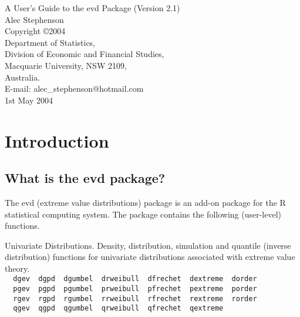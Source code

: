 \documentclass[11pt,a4paper]{article}
\begin{document}
\sloppy

\begin{center}
\LARGE 
A User's Guide to the evd Package (Version 2.1) \\
\Large
\vspace{0.2cm}
Alec Stephenson \\
\normalsize
Copyright \copyright 2004 \\
\vspace{0.2cm}
Department of Statistics,\\
Division of Economic and Financial Studies,\\
Macquarie University, NSW 2109,\\
Australia. \\
\vspace{0.2cm}
E-mail: alec\_stephenson@hotmail.com \\
1st May 2004 
\end{center}


\section{Introduction}
\setcounter{footnote}{0}

\subsection{What is the evd package?}
\label{intro}

The evd (extreme value distributions) package is an add-on package for the R \citep{R} statistical computing system.
The package contains the following (user-level) functions.

Univariate Distributions. Density, distribution, simulation and quantile (inverse distribution) functions for univariate distributions associated with extreme value theory.\\ 
\verb+  dgev  dgpd  dgumbel  drweibull  dfrechet  dextreme  dorder+\\
\verb+  pgev  pgpd  pgumbel  prweibull  pfrechet  pextreme  porder+\\
\verb+  rgev  rgpd  rgumbel  rrweibull  rfrechet  rextreme  rorder+\\
\verb+  qgev  qgpd  qgumbel  qrweibull  qfrechet  qextreme+
\end{document}
